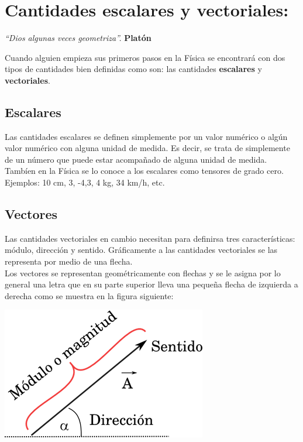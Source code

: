 \chapter{Cantidades escalares y vectoriales:}

\textit{``Dios algunas veces geometriza''.} \textbf{Platón} 
\vspace{1.00cm}

Cuando alguien empieza sus primeros pasos en la Física se encontrará con dos tipos de cantidades bien definidas como son: las 
cantidades \textbf{escalares} y \textbf{vectoriales}.\\

\section{Escalares}

Las cantidades escalares se definen simplemente por un valor numérico o algún valor numérico con alguna unidad de 
medida. Es decir, se trata de simplemente de un número que puede estar acompañado de alguna unidad de medida. Tambíen 
en la Física se lo conoce a los escalares como tensores de grado cero. Ejemplos: 10 cm, 3, -4,3, 4 kg, 34 km/h, etc.

\section{Vectores}

Las cantidades vectoriales en cambio necesitan para definirsa tres características: módulo, dirección y sentido. 
Gráficamente a las cantidades vectoriales se las representa por medio de una flecha.\\

Los vectores se representan geométricamente con flechas y se le asigna por lo general una letra que en su parte 
superior lleva una pequeña flecha de izquierda a derecha como se muestra en la figura siguiente:  

\begin{center}
 \includegraphics[scale = 0.4]{images/vector.png}
\end{center}

